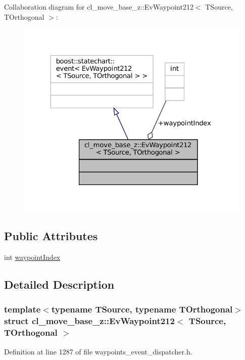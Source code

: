 Collaboration diagram for cl\+\_\+move\+\_\+base\+\_\+z\+:\+:Ev\+Waypoint212$<$ T\+Source, T\+Orthogonal $>$\+:
\nopagebreak
\begin{figure}[H]
\begin{center}
\leavevmode
\includegraphics[width=324pt]{structcl__move__base__z_1_1EvWaypoint212__coll__graph}
\end{center}
\end{figure}
\subsection*{Public Attributes}
\begin{DoxyCompactItemize}
\item 
int \hyperlink{structcl__move__base__z_1_1EvWaypoint212_a9ff84061a9098659fdf0d3fbf0f3859c}{waypoint\+Index}
\end{DoxyCompactItemize}


\subsection{Detailed Description}
\subsubsection*{template$<$typename T\+Source, typename T\+Orthogonal$>$\newline
struct cl\+\_\+move\+\_\+base\+\_\+z\+::\+Ev\+Waypoint212$<$ T\+Source, T\+Orthogonal $>$}



Definition at line 1287 of file waypoints\+\_\+event\+\_\+dispatcher.\+h.



